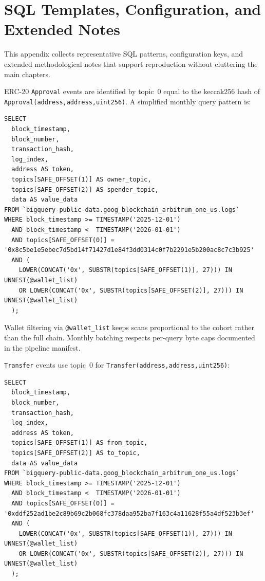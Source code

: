 \section{SQL Templates, Configuration, and Extended Notes}
\label{ch:appendix-sql}

This appendix collects representative SQL patterns, configuration keys, and extended methodological notes that support reproduction without cluttering the main chapters.


ERC-20 \texttt{Approval} events are identified by topic~$0$ equal to the keccak256 hash of \texttt{Approval(address,address,uint256)}. A simplified monthly query pattern is:

\begin{verbatim}
SELECT
  block_timestamp,
  block_number,
  transaction_hash,
  log_index,
  address AS token,
  topics[SAFE_OFFSET(1)] AS owner_topic,
  topics[SAFE_OFFSET(2)] AS spender_topic,
  data AS value_data
FROM `bigquery-public-data.goog_blockchain_arbitrum_one_us.logs`
WHERE block_timestamp >= TIMESTAMP('2025-12-01')
  AND block_timestamp <  TIMESTAMP('2026-01-01')
  AND topics[SAFE_OFFSET(0)] = '0x8c5be1e5ebec7d5bd14f71427d1e84f3dd0314c0f7b2291e5b200ac8c7c3b925'
  AND (
    LOWER(CONCAT('0x', SUBSTR(topics[SAFE_OFFSET(1)], 27))) IN UNNEST(@wallet_list)
    OR LOWER(CONCAT('0x', SUBSTR(topics[SAFE_OFFSET(2)], 27))) IN UNNEST(@wallet_list)
  );
\end{verbatim}

Wallet filtering via \texttt{@wallet\_list} keeps scans proportional to the cohort rather than the full chain. Monthly batching respects per-query byte caps documented in the pipeline manifest.


\texttt{Transfer} events use topic~$0$ for \texttt{Transfer(address,address,uint256)}:

\begin{verbatim}
SELECT
  block_timestamp,
  block_number,
  transaction_hash,
  log_index,
  address AS token,
  topics[SAFE_OFFSET(1)] AS from_topic,
  topics[SAFE_OFFSET(2)] AS to_topic,
  data AS value_data
FROM `bigquery-public-data.goog_blockchain_arbitrum_one_us.logs`
WHERE block_timestamp >= TIMESTAMP('2025-12-01')
  AND block_timestamp <  TIMESTAMP('2026-01-01')
  AND topics[SAFE_OFFSET(0)] = '0xddf252ad1be2c89b69c2b068fc378daa952ba7f163c4a11628f55a4df523b3ef'
  AND (
    LOWER(CONCAT('0x', SUBSTR(topics[SAFE_OFFSET(1)], 27))) IN UNNEST(@wallet_list)
    OR LOWER(CONCAT('0x', SUBSTR(topics[SAFE_OFFSET(2)], 27))) IN UNNEST(@wallet_list)
  );
\end{verbatim}

